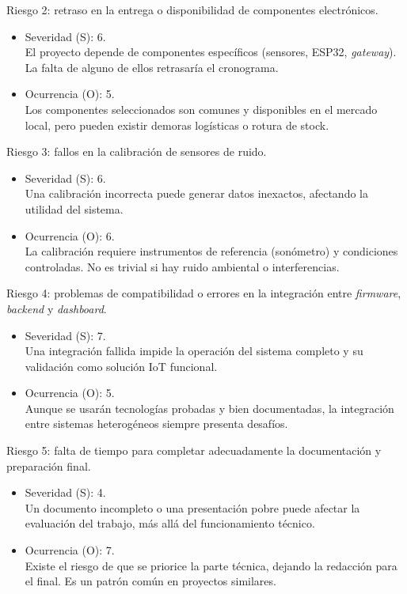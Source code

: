 \documentclass[
11pt, %
]{charter}
\begin{document}
\newpage

Riesgo 2: retraso en la entrega o disponibilidad de componentes electrónicos.
\begin{itemize}
	\item Severidad (S): 6.\\
	El proyecto depende de componentes específicos (sensores, ESP32, \textit{gateway}). La falta de alguno de ellos retrasaría el cronograma.
	\item Ocurrencia (O): 5.\\
	Los componentes seleccionados son comunes y disponibles en el mercado local, pero pueden existir demoras logísticas o rotura de stock.
\end{itemize}

Riesgo 3: fallos en la calibración de sensores de ruido.
\begin{itemize}
	\item Severidad (S): 6.\\
	Una calibración incorrecta puede generar datos inexactos, afectando la utilidad del sistema.
	\item Ocurrencia (O): 6.\\
	La calibración requiere instrumentos de referencia (sonómetro) y condiciones controladas. No es trivial si hay ruido ambiental o interferencias.
\end{itemize}

Riesgo 4: problemas de compatibilidad o errores en la integración entre \textit{firmware}, \textit{backend} y \textit{dashboard}.
\begin{itemize}
	\item Severidad (S): 7.\\
	Una integración fallida impide la operación del sistema completo y su validación como solución IoT funcional.
	\item Ocurrencia (O): 5.\\
	Aunque se usarán tecnologías probadas y bien documentadas, la integración entre sistemas heterogéneos siempre presenta desafíos.
\end{itemize}

Riesgo 5: falta de tiempo para completar adecuadamente la documentación y preparación final.
\begin{itemize}
	\item Severidad (S): 4.\\
	Un documento incompleto o una presentación pobre puede afectar la evaluación del trabajo, más allá del funcionamiento técnico.
	\item Ocurrencia (O): 7.\\
	Existe el riesgo de que se priorice la parte técnica, dejando la redacción para el final. Es un patrón común en proyectos similares.
\end{itemize}
\end{document}
